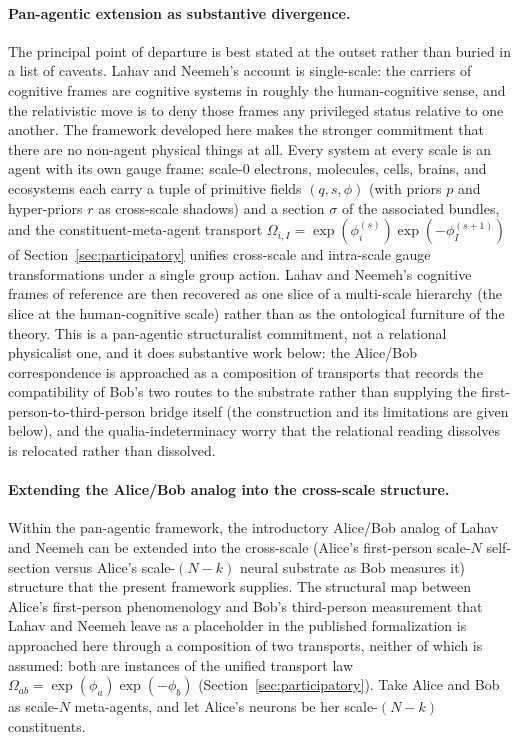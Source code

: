 \documentclass[11pt]{article}
\begin{document}
\paragraph{Pan-agentic extension as substantive divergence.}
The principal point of departure is best stated at the outset rather than buried in a list of caveats. Lahav and Neemeh's account is single-scale: the carriers of cognitive frames are cognitive systems in roughly the human-cognitive sense, and the relativistic move is to deny those frames any privileged status relative to one another. The framework developed here makes the stronger commitment that there are no non-agent physical things at all. Every system at every scale is an agent with its own gauge frame: scale-0 electrons, molecules, cells, brains, and ecosystems each carry a tuple of primitive fields $(q, s, \phi)$ (with priors $p$ and hyper-priors $r$ as cross-scale shadows) and a section $\sigma$ of the associated bundles, and the constituent-meta-agent transport $\Omega_{i,I} = \exp(\phi_i^{(s)}) \exp(-\phi_I^{(s+1)})$ of Section~\ref{sec:participatory} unifies cross-scale and intra-scale gauge transformations under a single group action. Lahav and Neemeh's cognitive frames of reference are then recovered as one slice of a multi-scale hierarchy (the slice at the human-cognitive scale) rather than as the ontological furniture of the theory. This is a pan-agentic structuralist commitment, not a relational physicalist one, and it does substantive work below: the Alice/Bob correspondence is approached as a composition of transports that records the compatibility of Bob's two routes to the substrate rather than supplying the first-person-to-third-person bridge itself (the construction and its limitations are given below), and the qualia-indeterminacy worry that the relational reading dissolves is relocated rather than dissolved.

\paragraph{Extending the Alice/Bob analog into the cross-scale structure.}
Within the pan-agentic framework, the introductory Alice/Bob analog of Lahav and Neemeh can be extended into the cross-scale (Alice's first-person scale-$N$ self-section versus Alice's scale-$(N-k)$ neural substrate as Bob measures it) structure that the present framework supplies. The structural map between Alice's first-person phenomenology and Bob's third-person measurement that Lahav and Neemeh leave as a placeholder in the published formalization is approached here through a composition of two transports, neither of which is assumed: both are instances of the unified transport law $\Omega_{ab} = \exp(\phi_a) \exp(-\phi_b)$ (Section~\ref{sec:participatory}). Take Alice and Bob as scale-$N$ meta-agents, and let Alice's neurons be her scale-$(N-k)$ constituents.
\end{document}
